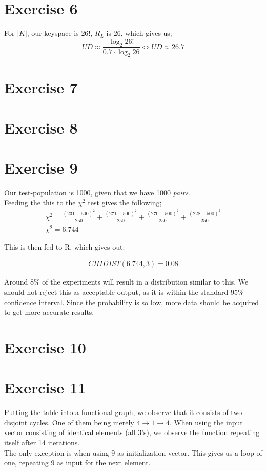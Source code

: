 \documentclass[10pt,a4paper]{article}
\begin{document}
\section*{Exercise 6}
For $|K|$, our keyspace is $26!$, $R_L$ is $26$, which gives us;
\begin{equation}
UD \approx \frac{\log_2{26!}}{0.7 \cdot \log_2{26}} \Leftrightarrow UD \approx 26.7
\end{equation}

\section*{Exercise 7}
\section*{Exercise 8}
\section*{Exercise 9}
Our test-population is 1000, given that we have 1000 \emph{pairs}.\\
Feeding the this to the $\chi^2$ test gives the following;
\begin{eqnarray}
\chi^2 = \frac{\left(231 - 500\right)^2}{250} + 
         \frac{\left(271 - 500\right)^2}{250} + 
         \frac{\left(270 - 500\right)^2}{250} + 
         \frac{\left(228 - 500\right)^2}{250} \\
\chi^2 = 6.744
\end{eqnarray}

This is then fed to R, which gives out:

\begin{eqnarray}
CHIDIST \left(6.744,3\right) = 0.08
\end{eqnarray}

Around 8\% of the experiments will result in a distribution similar to this. We should not reject this as acceptable output, as it is within the standard 95\% confidence interval. Since the probability is so low, more data should be acquired to get more accurate results.

\section*{Exercise 10}
\section*{Exercise 11}
Putting the table into a functional graph, we observe that it consists of two disjoint cycles. One of them being merely $4 \rightarrow 1 \rightarrow 4$.
When using the input vector consisting of identical elements (all 3's), we observe the function repeating itself after 14 iterations.\\
The only exception is when using 9 as initialization vector. This gives us a loop of one, repeating 9 as input for the next element.
\end{document}
